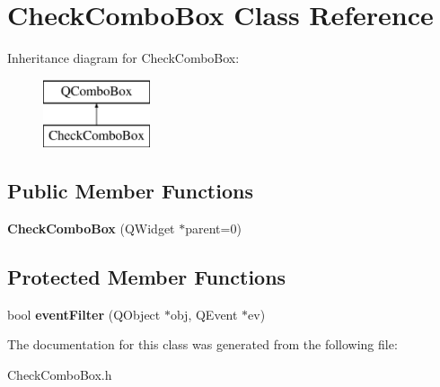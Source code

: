\hypertarget{class_check_combo_box}{\section{Check\-Combo\-Box Class Reference}
\label{class_check_combo_box}
}
Inheritance diagram for Check\-Combo\-Box\-:\begin{figure}[H]
\begin{center}
\leavevmode
\includegraphics[height=2.000000cm]{class_check_combo_box}
\end{center}
\end{figure}
\subsection*{Public Member Functions}
\begin{DoxyCompactItemize}
\item 
\hypertarget{class_check_combo_box_a43ffd3504d101cb4926641735421b56b}{{\bfseries Check\-Combo\-Box} (Q\-Widget $\ast$parent=0)}\label{class_check_combo_box_a43ffd3504d101cb4926641735421b56b}

\end{DoxyCompactItemize}
\subsection*{Protected Member Functions}
\begin{DoxyCompactItemize}
\item 
\hypertarget{class_check_combo_box_a04c4cdf9dd2289a569d43711f4dcd59a}{bool {\bfseries event\-Filter} (Q\-Object $\ast$obj, Q\-Event $\ast$ev)}\label{class_check_combo_box_a04c4cdf9dd2289a569d43711f4dcd59a}

\end{DoxyCompactItemize}


The documentation for this class was generated from the following file\-:\begin{DoxyCompactItemize}
\item 
Check\-Combo\-Box.\-h\end{DoxyCompactItemize}
